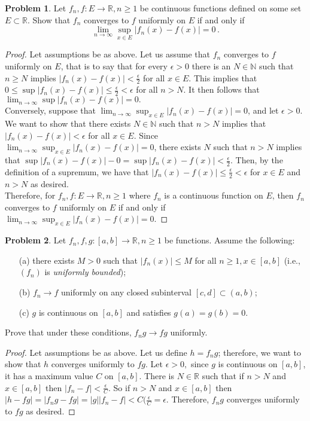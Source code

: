 \documentclass[11pt]{article}
\theoremstyle{definition}
\newtheorem{problem}{Problem}
\newcommand{\N}{\mathbb{N}}
\newcommand{\R}{\mathbb{R}}
\begin{document}
\pagebreak
\begin{problem}
Let $f_n, f : E \to \R, n \geq 1$ be continuous functions defined on some set $E \subset \R$. Show that $f_n$ converges to $f$ uniformly on $E$ if and only if 
\[
\lim_{n \to \infty} \sup_{x \in E} | f_n(x) - f(x)| = 0 \, . 
\]
\end{problem}

\begin{proof}
Let assumptions be as above. Let us assume that $f_n$ converges to $f$ uniformly on $E$, that is to say that for every $\epsilon > 0$ there is an $N\in \N$ such that $n \geq N$ implies $|f_n(x) - f(x)| < \frac{\epsilon}{2}$ for all $x\in E.$ This implies that $0 \leq \sup|f_n(x) - f(x)| \leq \frac{\epsilon}{2} < \epsilon$ for all $n > N$. It then follows that $\lim_{n\to \infty} \sup|f_n(x)-f(x)| = 0.$\\
Conversely, suppose that $\lim_{n \to \infty} \sup_{x \in E} | f_n(x) - f(x)| = 0$, and let $\epsilon > 0.$ We want to show that there exists $N \in \N$ such that $n > N$ implies that $|f_n(x) - f(x)| < \epsilon$ for all $x\in E$. Since $\lim_{n \to \infty} \sup_{x \in E} | f_n(x) - f(x)| = 0$, there exists $N$ such that $n > N$ implies that $\sup|f_n(x)-f(x)| - 0 = \sup|f_n(x)-f(x)| < \frac{\epsilon}{2}.$ Then, by the definition of a supremum, we have that $|f_n(x) - f(x)| \leq \frac{\epsilon}{2}<\epsilon$ for $x \in E$ and $n > N$ as desired.\\
Therefore, for $f_n, f: E\to \R, n\geq 1$ where $f_n$ is a continuous function on $E$, then $f_n$ converges to $f$ uniformly on $E$ if and only if $\lim_{n \to \infty} \sup_{x \in E} | f_n(x) - f(x)| = 0.$
\end{proof}

\pagebreak
\begin{problem}
Let $f_n, f, g : [a,b] \to \R, n \geq 1$ be functions. Assume the following: 
\begin{itemize}
	\item[(a)] there exists $M > 0$ such that $|f_n(x)| \leq M$ for all $n \geq 1, x \in [a,b]$ (i.e., $(f_n)$ is \emph{uniformly bounded}); 
	\item[(b)] $f_n \to f$ uniformly on any closed subinterval $[c,d] \subset (a,b)$; 
	\item[(c)] $g$ is continuous on $[a,b]$ and satisfies $g(a) = g(b) = 0$. 
\end{itemize} 
Prove that under these conditions, $f_n g \to f g$ uniformly. 
\end{problem}

\begin{proof}
Let assumptions be as above. Let us define $h = f_ng$; therefore, we want to show that $h$ converges uniformly to $fg$. Let $\epsilon > 0,$ since $g$ is continuous on $[a, b]$, it has a maximum value $C$ on $[a,b]$. There is $N \in \R$ such that if $n > N$ and $x\in [a,b]$ then $|f_n-f| < \frac{\epsilon}{C}.$ So if $n > N$ and $x\in [a, b]$ then $|h -fg| = |f_ng-fg| = |g||f_n-f| < C(\frac{\epsilon}{C} = \epsilon.$ Therefore, $f_ng$ converges uniformly to $fg$ as desired.
\end{proof}
\end{document}
